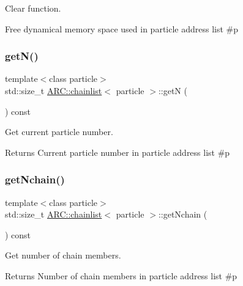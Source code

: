 Clear function. 

Free dynamical memory space used in particle address list \#p \hypertarget{classARC_1_1chainlist_a9b45780f42626b14e3a2fd7b5de4bf32}{}\label{classARC_1_1chainlist_a9b45780f42626b14e3a2fd7b5de4bf32} 
\subsubsection{\texorpdfstring{get\+N()}{getN()}}
{\footnotesize\ttfamily template$<$class particle$>$ \\
std\+::size\+\_\+t \hyperlink{classARC_1_1chainlist}{A\+R\+C\+::chainlist}$<$ particle $>$\+::getN (\begin{DoxyParamCaption}{ }\end{DoxyParamCaption}) const\hspace{0.3cm}{\ttfamily [inline]}}



Get current particle number. 

\begin{DoxyReturn}{Returns}
Current particle number in particle address list \#p 
\end{DoxyReturn}
\hypertarget{classARC_1_1chainlist_aa1bd568975acc3bab3410e4fc9cb4d94}{}\label{classARC_1_1chainlist_aa1bd568975acc3bab3410e4fc9cb4d94} 
\subsubsection{\texorpdfstring{get\+Nchain()}{getNchain()}}
{\footnotesize\ttfamily template$<$class particle$>$ \\
std\+::size\+\_\+t \hyperlink{classARC_1_1chainlist}{A\+R\+C\+::chainlist}$<$ particle $>$\+::get\+Nchain (\begin{DoxyParamCaption}{ }\end{DoxyParamCaption}) const\hspace{0.3cm}{\ttfamily [inline]}}



Get number of chain members. 

\begin{DoxyReturn}{Returns}
Number of chain members in particle address list \#p 
\end{DoxyReturn}
\hypertarget{classARC_1_1chainlist_a14c6b75c2d3e97cf9babcac2aa014e8a}{}\label{classARC_1_1chainlist_a14c6b75c2d3e97cf9babcac2aa014e8a} 
